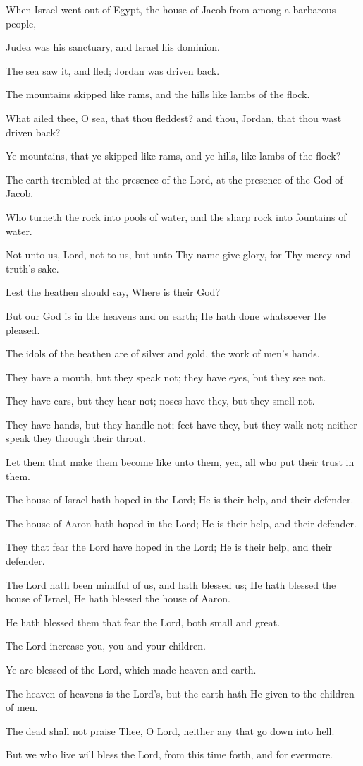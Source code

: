 When Israel went out of Egypt, the house of Jacob from among a barbarous people,

Judea was his sanctuary, and Israel his dominion.

The sea saw it, and fled; Jordan was driven back.

The mountains skipped like rams, and the hills like lambs of the flock.

What ailed thee, O sea, that thou fleddest? and thou, Jordan, that thou wast driven back?

Ye mountains, that ye skipped like rams, and ye hills, like lambs of the flock?

The earth trembled at the presence of the Lord, at the presence of the God of Jacob.

Who turneth the rock into pools of water, and the sharp rock into fountains of water.

Not unto us, Lord, not to us, but unto Thy name give glory, for Thy mercy and truth’s sake.

Lest the heathen should say, Where is their God?

But our God is in the heavens and on earth; He hath done whatsoever He pleased.

The idols of the heathen are of silver and gold, the work of men’s hands.

They have a mouth, but they speak not; they have eyes, but they see not.

They have ears, but they hear not; noses have they, but they smell not.

They have hands, but they handle not; feet have they, but they walk not; neither speak they through their throat.

Let them that make them become like unto them, yea, all who put their trust in them.

The house of Israel hath hoped in the Lord; He is their help, and their defender.

The house of Aaron hath hoped in the Lord; He is their help, and their defender.

They that fear the Lord have hoped in the Lord; He is their help, and their defender.

The Lord hath been mindful of us, and hath blessed us; He hath blessed the house of Israel, He hath blessed the house of Aaron.

He hath blessed them that fear the Lord, both small and great.

The Lord increase you, you and your children.

Ye are blessed of the Lord, which made heaven and earth.

The heaven of heavens is the Lord's, but the earth hath He given to the children of men.

The dead shall not praise Thee, O Lord, neither any that go down into hell.

But we who live will bless the Lord, from this time forth, and for evermore.
